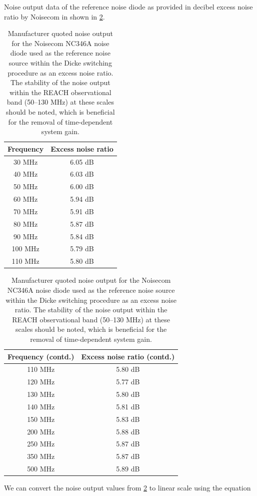 Noise output data of the reference noise diode as provided in decibel excess noise ratio by Noisecom in shown in \cref{tab:ns_noise}.
\begin{table}
    \begin{center}
    \begin{tabular}{ |c|c| }
        \hline
        {Frequency} & {Excess noise ratio} \\
        \hline
        30 MHz & 6.05 dB \\
        40 MHz & 6.03 dB \\
        50 MHz & 6.00 dB \\
        60 MHz & 5.94 dB \\
        70 MHz & 5.91 dB \\
        80 MHz & 5.87 dB \\
        90 MHz & 5.84 dB \\
        100 MHz & 5.79 dB \\
        110 MHz & 5.80 dB \\
        \hline
    \end{tabular}
    \quad
    \begin{tabular}{ |c|c| }
        \hline
        {Frequency (contd.)} & {Excess noise ratio (contd.)} \\
        \hline
        110 MHz & 5.80 dB \\
        120 MHz & 5.77 dB \\
        130 MHz & 5.80 dB \\
        140 MHz & 5.81 dB \\
        150 MHz & 5.83 dB \\
        200 MHz & 5.88 dB \\
        250 MHz & 5.87 dB \\
        350 MHz & 5.87 dB \\
        500 MHz & 5.89 dB \\
        \hline
    \end{tabular}
    \end{center}
    \caption{Manufacturer quoted noise output for the Noisecom NC346A noise diode used as the reference noise source within the Dicke switching procedure as an excess noise ratio. The stability of the noise output within the REACH observational band (50--130 MHz) at these scales should be noted, which is beneficial for the removal of time-dependent system gain.}
    \label{tab:ns_noise}
\end{table}
We can convert the noise output values from \cref{tab:ns_noise} to linear scale using the equation
